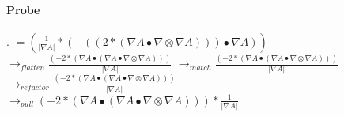 \documentclass{article}
\begin{document}
 \paragraph{Probe} . 
$= ( \frac{1}{| \nabla A|}*(-((2*( \nabla A \bullet  \nabla  \otimes  \nabla A))) \bullet  \nabla A))$
\newline $\rightarrow_{flatten} \frac{(-2*( \nabla A \bullet ( \nabla A \bullet  \nabla  \otimes  \nabla A)))}{| \nabla A|}$
\newline $\rightarrow_{match} \frac{(-2*( \nabla A \bullet ( \nabla A \bullet  \nabla  \otimes  \nabla A)))}{| \nabla A|}$
\newline $\rightarrow_{refactor} \frac{(-2*( \nabla A \bullet ( \nabla A \bullet  \nabla  \otimes  \nabla A)))}{| \nabla A|}$
\newline $\rightarrow_{pull}(-2*( \nabla A \bullet ( \nabla A \bullet  \nabla  \otimes  \nabla A)))* \frac{1}{| \nabla A|}$
\end{document}
